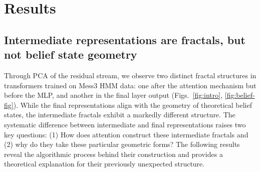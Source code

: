 \documentclass{article}
\theoremstyle{plain}
\theoremstyle{definition}
\theoremstyle{remark}
\begin{document}
\section{Results}
\subsection{Intermediate representations are fractals, but not belief state geometry}



Through PCA of the residual stream, we observe two distinct fractal structures in transformers trained on Mess3 HMM data: one after the attention mechanism but before the MLP, and another in the final layer output (Figs.~\ref{fig:intro}, \ref{fig:belief-fig}). While the final representations align with the geometry of theoretical belief states, the intermediate fractals exhibit a markedly different structure. The systematic difference between intermediate and final representations raises two key questions: (1) How does attention construct these intermediate fractals and (2) why do they take these particular geometric forms? The following results reveal the algorithmic process behind their construction and provides a theoretical explanation for their previously unexpected structure.
\end{document}
